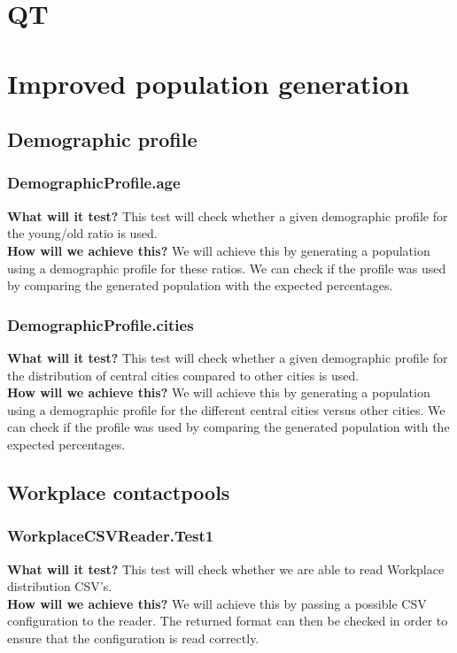 \documentclass{article}
\begin{document}
\section{QT}
\section{Improved population generation}
\subsection{Demographic profile}
\subsubsection{DemographicProfile.age} 
\textbf{What will it test?} 
This test will check whether a given demographic profile for the young/old ratio is used. \\
\newline
\textbf{How will we achieve this?} 
We will achieve this by generating a population using a demographic profile for these ratios. We can check if the profile was used by comparing the generated population with the expected percentages.

\subsubsection{DemographicProfile.cities}
\textbf{What will it test?} 
This test will check whether a given demographic profile for the distribution of central cities compared to other cities is used. \\
\newline
\textbf{How will we achieve this?}
We will achieve this by generating a population using a demographic profile for the different central cities versus other cities. We can check if the profile was used by comparing the generated population with the expected percentages.
\subsection{Workplace contactpools}

\subsubsection{WorkplaceCSVReader.Test1}
\textbf{What will it test?}
This test will check whether we are able to read Workplace distribution CSV's.\\
\newline
\textbf{How will we achieve this?}
We will achieve this by passing a possible CSV configuration to the reader. The returned format can then be checked in order to ensure that the configuration is read correctly.
\end{document}
